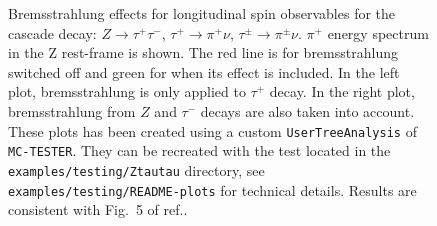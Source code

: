 \documentclass[]{Photos_interface_design}
\begin{document}
\begin{figure}[h!]
\centering
{}
\caption{ Bremsstrahlung effects for longitudinal spin observables
for the cascade decay: $Z \to \tau^+ \tau^-$, $\tau^+ \to \pi^+ \nu$,  $\tau^\pm \to \pi^\pm\nu$.
$\pi^+$ energy spectrum in the Z rest-frame  is shown. The red line is for 
bremsstrahlung switched off
and green for when its effect is included. 
In the left plot, bremsstrahlung is only applied to $\tau^+ $ decay.
In the right plot, bremsstrahlung from $Z$ and  $\tau^-$ decays are
 also taken into account.
These plots has been created using a custom {\tt UserTreeAnalysis} of {\tt MC-TESTER}.
They can be recreated with the test located in the {\tt examples/testing/Ztautau} directory, see  {\tt examples/testing/README-plots} for technical details. Results are 
consistent with Fig.~5 of ref.\cite{Eberhard:1989ve}.
\label{fig:KKMC}
}
\end{figure}
\end{document}
